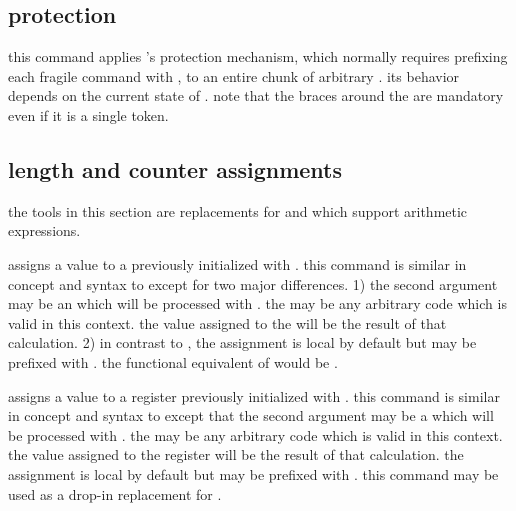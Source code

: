 \subsection{protection}
\label{use:pro}

\begin{ltxsyntax}


this command applies \latex's protection mechanism, which normally requires prefixing each fragile command with , to an entire chunk of arbitrary . its behavior depends on the current state of . note that the braces around the  are mandatory even if it is a single token.

\end{ltxsyntax}

\subsection[lengths and counters]{length and counter assignments}
\label{use:cal}

the tools in this section are replacements for  and  which support arithmetic expressions.

\begin{ltxsyntax}


assigns a value to a \latex {} previously initialized with . this command is similar in concept and syntax to  except for two major differences. 1) the second argument may be an  which will be processed with . the  may be any arbitrary code which is valid in this context. the value assigned to the  will be the result of that calculation. 2) in contrast to , the assignment is local by default but  may be prefixed with . the functional equivalent of  would be .


assigns a value to a  register previously initialized with . this command is similar in concept and syntax to  except that the second argument may be a  which will be processed with . the  may be any arbitrary code which is valid in this context. the value assigned to the  register will be the result of that calculation. the assignment is local by default but  may be prefixed with . this command may be used as a drop-in replacement for .

\end{ltxsyntax}


